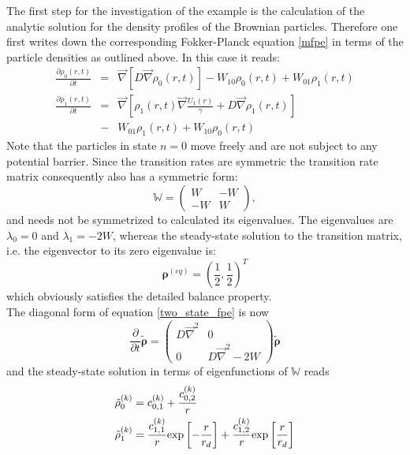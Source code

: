 \documentclass[preprint,superscriptaddress]{revtex4-1}
\newcommand{\vect}[1]{\boldsymbol{\mathbf{#1}}}
\begin{document}
The first step for the investigation of the example is the calculation of the analytic solution for the density profiles of the Brownian particles. Therefore one first writes down the corresponding Fokker-Planck equation \eqref{mfpe} in terms of the particle densities as outlined above. In this case it reads:
\begin{eqnarray}
    \frac{\partial \rho_0(r,t)}{\partial t} &=& \vec \nabla \left[ D \vec \nabla \rho_0(r,t) \right] - W_{10}\rho_0(r,t) + W_{01}\rho_1(r,t) \nonumber \\
    \frac{\partial \rho_1(r,t)}{\partial t} &=& \vec \nabla \left[\rho_1(r,t) \vec \nabla \frac{U_1(r)}{\gamma} + D \vec \nabla \rho_1(r,t) \right]  \nonumber \\ 
    &-& W_{01}\rho_1(r,t) + W_{10}\rho_0(r,t)
    \label{two_state_fpe}
\end{eqnarray}
Note that the particles in state $n=0$ move freely and are not subject to any potential barrier. 
Since the transition rates are symmetric the transition rate matrix consequently also has a symmetric form:
\begin{equation}
    \mathbb{W} = \left( \begin{array}{rr}
    W & -W \\
    -W & W 
\end{array} \right),
    \label{two_state_transition_matrix}
\end{equation}
and needs not be symmetrized to calculated its eigenvalues.
The eigenvalues are $\lambda_0 = 0$ and $\lambda_1 = -2W$, whereas the steady-state solution to the transition matrix, i.e. the eigenvector to its zero eigenvalue is: 
\begin{equation}
    \vect{\rho}^{(eq)}=\left(\frac{1}{2}, \frac{1}{2}\right)^{T}
    \label{rhoeq}
\end{equation}
which obviously satisfies the detailed balance property. \\
The diagonal form of equation \eqref{two_state_fpe} is now 
\begin{equation}
    \frac{\partial}{\partial t} \tilde{\vect{\rho}} = \left( \begin{array}{ll}
        D\vec{\nabla}^{2} & 0 \\
        0 & D\vec{\nabla}^{2} - 2W
    \end{array} \right) \tilde{\vect{\rho}}
    \label{fpmeq5}
\end{equation}
and the steady-state solution in terms of eigenfunctions of $\mathbb{W}$ reads
\begin{align}
    \tilde{\rho}_0^{(k)} &= c_{0,1}^{(k)} + \frac{c_{0,2}^{(k)}}{r} \\
    \tilde{\rho}_1^{(k)} &= \frac{c_{1,1}^{(k)}}{r}{\rm exp}\left[-\frac{r}{r_d}\right]+ \frac{c_{1,2}^{(k)}}{r}{\rm exp}\left[\frac{r}{r_d}\right]
    \label{ind_sol_U2}
\end{align}
\end{document}

